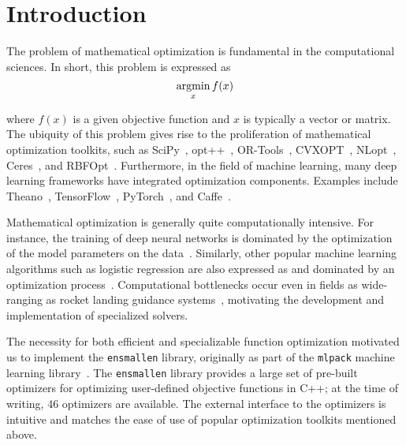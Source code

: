 \section{Introduction}
\label{sec:introduction}

The problem of mathematical optimization is fundamental in the computational
sciences.  In short, this problem is expressed as
%
\begin{equation}
\operatornamewithlimits{argmin}_x f(x)
\end{equation}

\noindent
where $f(x)$ is a given objective function and $x$ is typically a vector or matrix.
The ubiquity of this problem gives rise to the proliferation of mathematical
optimization toolkits, such as SciPy~\cite{2019arXiv190710121V},
opt++~\cite{meza1994opt++},
OR-Tools~\cite{ortools}, CVXOPT~\cite{vandenberghe2010cvxopt},
NLopt~\cite{johnson2014nlopt}, Ceres~\cite{ceres-solver},
and RBFOpt~\cite{costa2018rbfopt}.
Furthermore, in the field of machine learning, many
deep learning frameworks have integrated optimization
components.  Examples include Theano~\cite{2016arXiv160502688},
TensorFlow~\cite{tensorflow2015-whitepaper}, PyTorch~\cite{NEURIPS2019_9015},
and Caffe~\cite{jia2014caffe}.

Mathematical optimization is generally quite computationally intensive.
For instance, the training of deep neural networks is dominated by
the optimization of the model parameters on the
data~\cite{krizhevsky2012imagenet, lauzon2012introduction}.  Similarly,
other popular machine learning algorithms such as logistic regression are also
expressed as and dominated by an optimization process~\cite{zhang2004solving,
manogaran2018health}.  Computational bottlenecks occur even in fields as
wide-ranging as rocket landing guidance systems~\cite{dueri2016customized},
motivating the development and implementation of specialized solvers.

The necessity for both efficient and specializable function optimization motivated us
to implement the {\tt ensmallen} library, originally as part of the {\tt mlpack}
machine learning library~\cite{mlpack2018}.
The {\tt ensmallen} library provides a large {set of pre-built optimizers} for optimizing
{user-defined objective functions} in C++;
at the time of writing, 46 optimizers are available.  
The external interface to the optimizers is intuitive and matches the ease of use of popular
optimization toolkits mentioned above.


